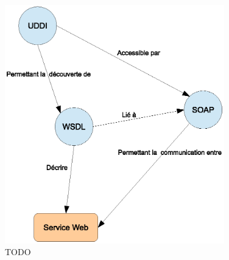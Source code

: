 \begin{figure}[h]
    \centering
    \includegraphics[width=0.85\textwidth]{figs/ws-standards-relationships.eps}
    \caption{TODO}
    \label{fig:ws-standards-relationships}
\end{figure}


